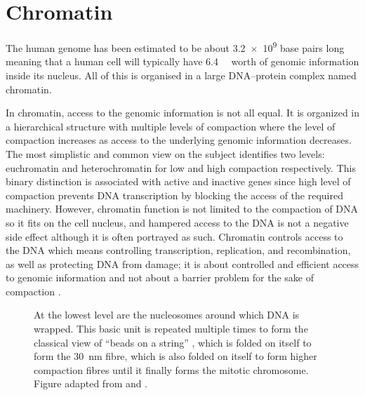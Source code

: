 \section{Chromatin}

  The human genome has been estimated to be about \num{3.2e9}
  base pairs long \citep{nature-first-human-genome-draft}
  meaning that a human cell will
  typically have \SI{6.4}{\giga\bp} worth of genomic information inside
  its nucleus.
  All of this is organised in a large DNA--protein complex named chromatin.

  In chromatin, access to the genomic information is not all equal.
  It is organized in a hierarchical structure with
  multiple levels of compaction  where
  the level of compaction increases as access to the underlying genomic
  information decreases.
  The most simplistic and common view on the subject
  identifies two levels: euchromatin and heterochromatin for low and
  high compaction respectively.
  This binary distinction is associated with active and inactive genes
  since high level of compaction prevents DNA transcription by blocking
  the access of the required machinery.
  However, chromatin function is not limited to the compaction of DNA
  so it fits on the
  cell nucleus, and hampered access to the DNA is not a negative side
  effect although it is often portrayed as such.
  Chromatin controls access
  to the DNA which means controlling transcription, replication,
  and recombination, as
  well as protecting DNA from damage;  it is about controlled and efficient
  access to genomic information and not about a barrier problem for the sake
  of compaction \citep{controlling-double-helix}.

  \begin{figure}
    \centering
    \def\svgwidth{\textwidth}
                 {At the lowest level are the nucleosomes around which
                  DNA is wrapped.
                  This basic unit is repeated multiple times to form
                  the classical view of ``beads on a string''
                  ,
                  which is folded on itself to form the
                  \SI{30}{\nano\meter} fibre,
                  which is also folded on itself to form higher
                  compaction fibres until it finally forms the
                  mitotic chromosome.
                  Figure adapted from \cite{alberts} and \cite{lodish}.}
    \label{fig:intro:chromatin-structure}
  \end{figure}

